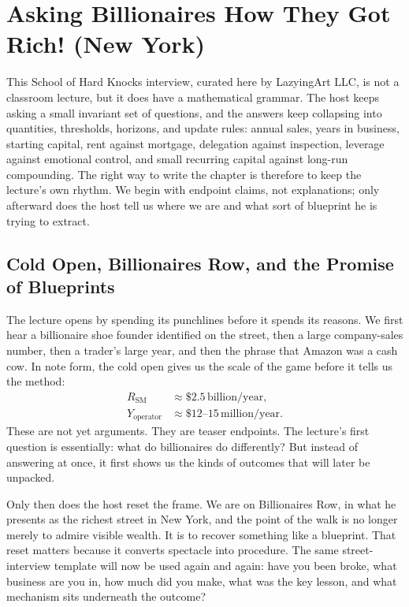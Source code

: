\chapter{Asking Billionaires How They Got Rich! (New York)}

This School of Hard Knocks interview, curated here by LazyingArt LLC, is not a classroom lecture, but it does have a mathematical grammar. The host keeps asking a small invariant set of questions, and the answers keep collapsing into quantities, thresholds, horizons, and update rules: annual sales, years in business, starting capital, rent against mortgage, delegation against inspection, leverage against emotional control, and small recurring capital against long-run compounding. The right way to write the chapter is therefore to keep the lecture's own rhythm. We begin with endpoint claims, not explanations; only afterward does the host tell us where we are and what sort of blueprint he is trying to extract.

\section{Cold Open, Billionaires Row, and the Promise of Blueprints}

The lecture opens by spending its punchlines before it spends its reasons. We first hear a billionaire shoe founder identified on the street, then a large company-sales number, then a trader's large year, and then the phrase that Amazon was a cash cow. In note form, the cold open gives us the scale of the game before it tells us the method:
\begin{align}
R_{\text{SM}} &\approx \$2.5\,\text{billion/year},\\
Y_{\text{operator}} &\approx \$12\text{--}15\,\text{million/year}.
\end{align}
These are not yet arguments. They are teaser endpoints. The lecture's first question is essentially: what do billionaires do differently? But instead of answering at once, it first shows us the kinds of outcomes that will later be unpacked.

Only then does the host reset the frame. We are on Billionaires Row, in what he presents as the richest street in New York, and the point of the walk is no longer merely to admire visible wealth. It is to recover something like a blueprint. That reset matters because it converts spectacle into procedure. The same street-interview template will now be used again and again: have you been broke, what business are you in, how much did you make, what was the key lesson, and what mechanism sits underneath the outcome?

